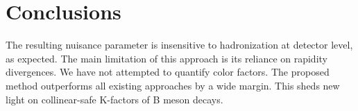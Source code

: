 \section{Conclusions}\label{sec:conclusions}

The resulting nuisance parameter is insensitive to hadronization at
detector level, as expected. The main limitation of this approach is its
reliance on rapidity divergences. We have not attempted to quantify
color factors. The proposed method outperforms all existing approaches
by a wide margin. This sheds new light on collinear-safe K-factors of B
meson decays.

